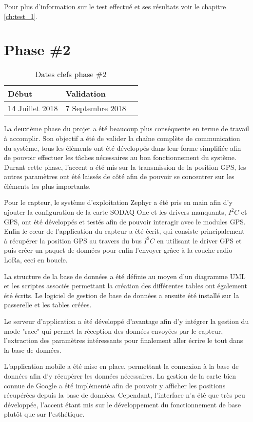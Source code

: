 Pour plus d'information sur le test effectué et ses résultats voir le chapitre \ref{ch:test_1}.

\section{Phase \#2}

\begin{table}[htb]
\caption{Dates clefs phase \#2}
\label{tab:detail_phase_2}
\centering
\begin{tabular}{ l l l }
\toprule
Début & Validation \\
\midrule
14 Juillet 2018 & 7 Septembre 2018  \\
\bottomrule 
\end{tabular}
\end{table}

La deuxième phase du projet a été beaucoup plus conséquente en terme de travail à accomplir. Son objectif a été de valider la chaîne complète de communication du système, tous les éléments ont été développés dans leur forme simplifiée afin de pouvoir effectuer les tâches nécessaires au bon fonctionnement du système. Durant cette phase, l'accent a été mis sur la transmission de la position GPS, les autres paramètres ont été laissés de côté afin de pouvoir se concentrer sur les éléments les plus importants.

Pour le capteur, le système d'exploitation Zephyr a été pris en main afin d'y ajouter la configuration de la carte SODAQ One et les drivers manquants, $I^{2}C$ et GPS, ont été développés et testés afin de pouvoir interagir avec le modules GPS. Enfin le cœur de l'application du capteur a été écrit, qui consiste principalement à récupérer la position GPS au travers du bus $I^{2}C$ en utilisant le driver GPS et puis créer un paquet de données pour enfin l'envoyer grâce à la couche radio LoRa, ceci en boucle.

La structure de la base de données a été définie au moyen d'un diagramme UML et les scriptes associés permettant la création des différentes tables ont également été écrits. Le logiciel de gestion de base de données a ensuite été installé sur la passerelle et les tables créées.

Le serveur d'application a été développé d'avantage afin d'y intégrer la gestion du mode "race" qui permet la réception des données envoyées par le capteur, l'extraction des paramètres intéressants pour finalement aller écrire le tout dans la base de données.

L'application mobile a été mise en place, permettant la connexion à la base de données afin d'y récupérer les données nécessaires. La gestion de la carte bien connue de Google a été implémenté afin de pouvoir y afficher les positions récupérées depuis la base de données. Cependant, l'interface n'a été que très peu développée, l'accent étant mis sur le développement du fonctionnement de base plutôt que sur l'esthétique.

